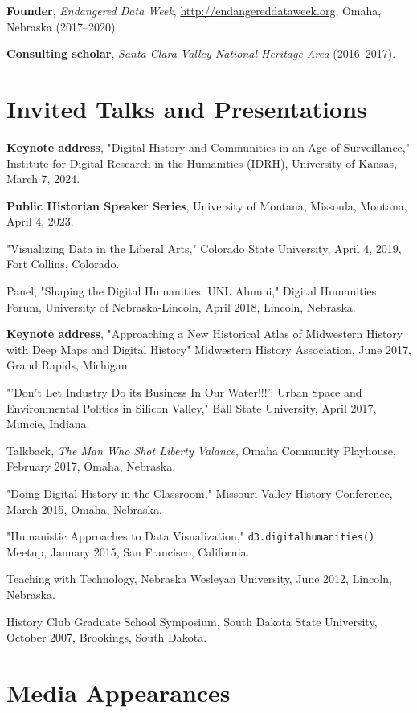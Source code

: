 \documentclass[10pt]{article}
\begin{document}
\textbf{Founder}, \textit{Endangered Data Week}, \url{http://endangereddataweek.org}, Omaha, Nebraska (2017--2020).

\textbf{Consulting scholar}, \textit{Santa Clara Valley National Heritage Area} (2016--2017).

\section{Invited Talks and Presentations}

\textbf{Keynote address}, "Digital History and Communities in an Age of Surveillance," Institute for Digital Research in the Humanities (IDRH), University of Kansas, March 7, 2024.

\textbf{Public Historian Speaker Series}, University of Montana, Missoula, Montana, April 4, 2023.

"Visualizing Data in the Liberal Arts," Colorado State University, April 4, 2019, Fort Collins, Colorado.

Panel, "Shaping the Digital Humanities: UNL Alumni," Digital Humanities Forum, University of Nebraska-Lincoln, April 2018, Lincoln, Nebraska.

\textbf{Keynote address}, "Approaching a New Historical Atlas of Midwestern History with Deep Maps and Digital History" Midwestern History Association, June 2017, Grand Rapids, Michigan.

"'Don't Let Industry Do its Business In Our Water!!!': Urban Space and Environmental Politics in Silicon Valley," Ball State University, April 2017, Muncie, Indiana.

Talkback, \textit{The Man Who Shot Liberty Valance}, Omaha Community Playhouse, February 2017, Omaha, Nebraska.

"Doing Digital History in the Classroom," Missouri Valley History Conference, March 2015, Omaha, Nebraska.

"Humanistic Approaches to Data Visualization," \texttt{d3.digitalhumanities()} Meetup, January 2015, San Francisco, California.

Teaching with Technology, Nebraska Wesleyan University, June 2012, Lincoln, Nebraska.

History Club Graduate School Symposium, South Dakota State University, October 2007, Brookings, South Dakota.

\section{Media Appearances}
\end{document}
